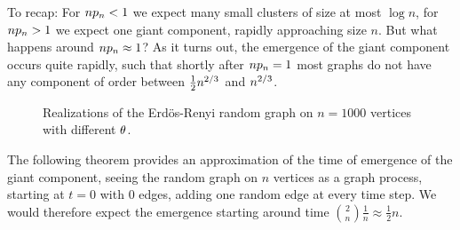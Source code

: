 
To recap: For $n p_n < 1$ we expect many small clusters of size at most $\log n$,
for $n p_n > 1$ we expect one giant component, rapidly approaching size $n$.
But what happens around $n p_n \approx 1$?
As it turns out, the emergence of the giant component occurs quite rapidly,
such that shortly after $n p_n = 1$ most graphs do not have any component of order between $\frac{1}{2}n^{2 / 3}$ and $n^{2 / 3}$.

\begin{figure}%
	\centering
	\quad
	\quad
	\caption{Realizations of the Erdös-Renyi random graph on $n=1000$ vertices with different $\theta$.}%
	\label{F: ER}%
\end{figure}

The following theorem provides an approximation of the time of emergence of the giant component,
seeing the random graph on $n$ vertices as a graph process,
starting at $t=0$ with $0$ edges, adding one random edge at every time step.
We would therefore expect the emergence starting around time $\binom{2}{n}\frac{1}{n} \approx \frac{1}{2}n$. 

